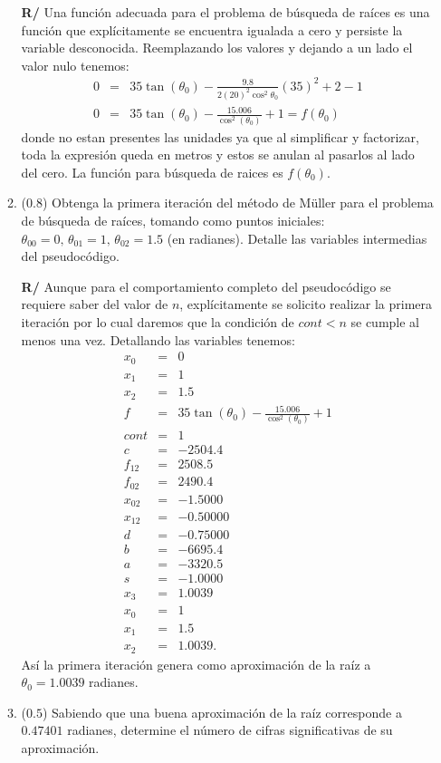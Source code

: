 \documentclass[12pt]{article}
\begin{document}
\begin{enumerate}[leftmargin=*,widest=9]
\begin{enumerate}[label=\alph*]
\textbf{R/} Una función adecuada para el problema de búsqueda de raíces es una función que explícitamente se encuentra igualada a cero y persiste la variable desconocida. Reemplazando los valores y dejando a un lado el valor nulo tenemos:
\begin{eqnarray*}
0&=&35\tan(\theta_{0}) - \frac{9.8}{2{(20)}^{2}\cos^{2}\theta_{0}}{(35)}^{2}+2 - 1 \\
0&=&35\tan(\theta_{0}) - \frac{15.006}{\cos^{2}(\theta_{0})} + 1 = f(\theta_0)
\end{eqnarray*}
donde no estan presentes las unidades ya que al simplificar y factorizar, toda la expresión queda en metros y estos se anulan al pasarlos al lado del cero. La función para búsqueda de raices es \(f(\theta_0)\).
\item (\(0.8\)) Obtenga la primera iteración del método de Müller para el problema de búsqueda de raíces, tomando como puntos iniciales: \(\theta_{00}=0,\, \theta_{01}=1,\, \theta_{02}=1.5\) (en radianes). Detalle las variables intermedias del pseudocódigo.

\textbf{R/} Aunque para el comportamiento completo del pseudocódigo se requiere saber del valor de \(n\), explícitamente se solicito realizar la primera iteración por lo cual daremos que la condición de \(cont<n\) se cumple al menos una vez. Detallando las variables tenemos:
\begin{eqnarray*}
x_0 &=& 0\\
x_1 &=& 1\\
x_2 &=& 1.5\\
f &=& 35\tan(\theta_{0}) - \frac{15.006}{\cos^{2}(\theta_{0})} + 1\\
cont &=& 1\\
c &=& -2504.4\\
f_{12} &=& 2508.5\\
f_{02} &=& 2490.4\\
x_{02} &=& -1.5000\\
x_{12} &=& -0.50000\\
d &=& -0.75000\\
b &=& -6695.4\\
a &=& -3320.5\\
s &=& -1.0000\\
x_3 &=& 1.0039\\
x_0 &=& 1\\
x_1 &=& 1.5\\
x_2 &=& 1.0039.
\end{eqnarray*}
Así la primera iteración genera como aproximación de la raíz a \(\theta_0 = 1.0039\) radianes.
\item (\(0.5\)) Sabiendo que una buena aproximación de la raíz corresponde a \(0.47401\) radianes, determine el número de cifras significativas de su aproximación.


\end{enumerate}
\end{enumerate}
\end{document}
